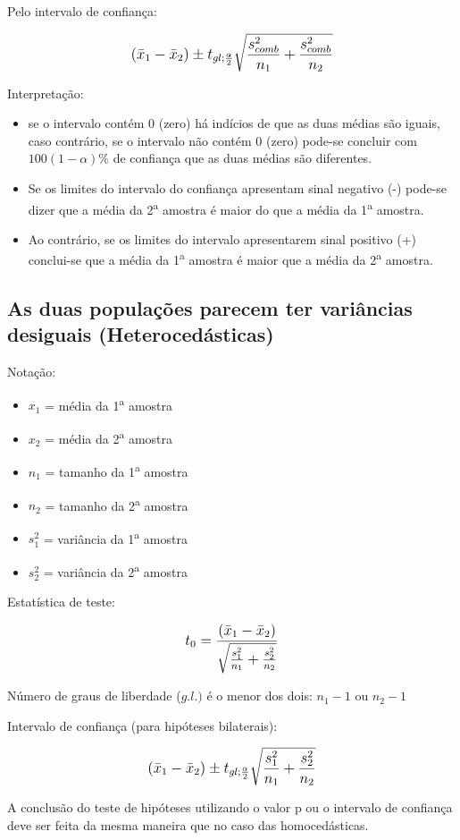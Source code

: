 Pelo intervalo de confiança:

\[\beq{ (\bar{x}_1 - \bar{x}_2) \pm t_{gl;\frac{\alpha}{2}}\sqrt{\frac{s_{comb}^2}{n_1} + \frac{s_{comb}^2}{n_2}} }\]

Interpretação:

\begin{itemize}
	\item se o intervalo contém 0 (zero) há indícios de que as duas médias são iguais, caso contrário, se o intervalo não contém 0 (zero) pode-se concluir com \( 100(1-\alpha)\% \) de confiança que as duas médias são diferentes.
		\item Se os limites do intervalo do confiança apresentam sinal negativo (-) pode-se dizer que a média da 2\textsuperscript{a} amostra é maior do que a média da 1\textsuperscript{a} amostra.
	\item Ao contrário, se os limites do intervalo apresentarem sinal positivo (+) conclui-se que a média da 1\textsuperscript{a} amostra é maior que a média da 2\textsuperscript{a} amostra.
\end{itemize}

\subsection{As duas populações parecem ter variâncias desiguais (Heterocedásticas)}

Notação:
\begin{itemize}
	\item \(x_1\) = média da 1\textsuperscript{a} amostra
	\item \(x_2\) = média da 2\textsuperscript{a} amostra
	\item \(n_1\) = tamanho da 1\textsuperscript{a} amostra
	\item \(n_2\) = tamanho da 2\textsuperscript{a} amostra
	\item \(s_1^2\) = variância da 1\textsuperscript{a} amostra
	\item \(s_2^2\) = variância da 2\textsuperscript{a} amostra 
\end{itemize}

Estatística de teste:

\[\beq{ t_0 = \frac{(\bar{x}_1-\bar{x}_2)}{\sqrt{\frac{s_1^2}{n_1} + \frac{s_2^2}{n_2}}} }\]

Número de graus de liberdade (\( g.l.) \) é o menor dos dois: \(n_1 - 1\)  ou  \(n_2 - 1\)

Intervalo de confiança (para hipóteses bilaterais): 

\[\beq{ (\bar{x}_1 - \bar{x}_2) \pm t_{gl;\frac{\alpha}{2}}\sqrt{\frac{s_1^2}{n_1} + \frac{s_2^2}{n_2}} }\]

A conclusão do teste de hipóteses utilizando o valor p ou o intervalo de confiança deve ser feita da mesma maneira que no caso das homocedásticas.